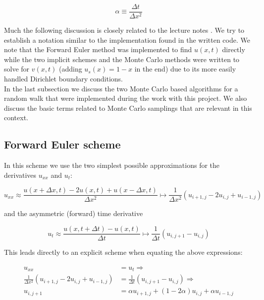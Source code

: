 \documentclass[a4paper, 11pt, notitlepage,english]{article}
\begin{document}
\begin{equation}
 \alpha \equiv \frac{\Delta t}{\Delta x^2}
\label{eq:Step_parameter}
\end{equation}

Much the following discussion is closely related to the lecture notes \cite{Komp3150}. We try to establish a notation similar to the implementation found in the written code. We note that the Forward Euler method was implemented to find $u(x,t)$ directly while the two implicit schemes and the Monte Carlo methods were written to solve for $v(x,t)$ (adding $u_s(x) = 1-x$ in the end) due to its more easily handled Dirichlet boundary conditions. \\

In the last subsection we discuss the two Monte Carlo based algorithms for a random walk that were implemented during the work with this project. We also discuss the basic terms related to Monte Carlo samplings that are relevant in this context.

\subsection{Forward Euler scheme}
In this scheme we use the two simplest possible approximations for the derivatives $u_{xx}$ and $u_t$:

\begin{equation}
u_{xx} \approx \frac{u(x+\Delta x,t)-2u(x,t)+u(x-\Delta x, t)}{\Delta x^2} \mapsto \frac{1}{\Delta x^2} (u_{i+1,j}-2u_{i,j}+u_{i-1,j})
\label{eq:Forward_uxx}
\end{equation}

and the asymmetric (forward) time derivative

\begin{equation}
u_{t} \approx \frac{u(x,t+\Delta t)-u(x, t)}{\Delta t} \mapsto \frac{1}{\Delta t} (u_{i,j+1}-u_{i,j})
\label{eq:Forward_ut}
\end{equation}

This leads directly to an explicit scheme when equating the above expressions:

\begin{align}
u_{xx} &= u_t \Rightarrow \\
 \frac{1}{\Delta x^2} (u_{i+1,j}-2u_{i,j}+u_{i-1,j}) &= \frac{1}{\Delta t} (u_{i,j+1}-u_{i,j}) \Rightarrow \\
 u_{i,j+1} &= \alpha u_{i+1,j} + (1-2\alpha)u_{i,j} + \alpha u_{i-1,j}
\label{eq:Forward_Euler_scheme}
\end{align}
\end{document}
